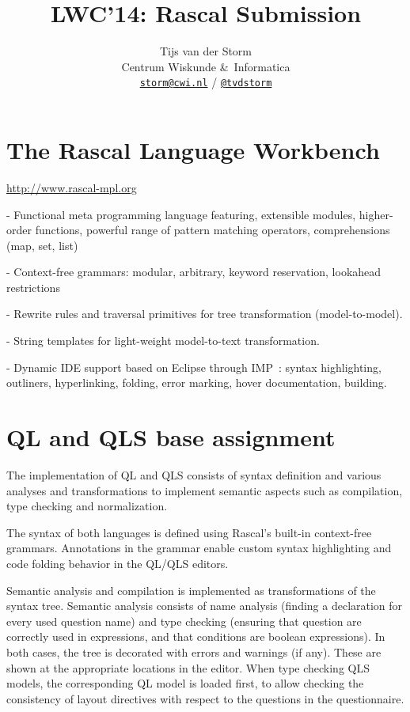 \documentclass[a4paper]{article}
\begin{document}
\title{LWC'14: Rascal Submission}
\author{Tijs van der Storm \\ 
Centrum Wiskunde \&\ Informatica \\
\href{mailto:storm@cwi.nl}{\texttt{storm@cwi.nl}} / \href{http://twitter.com/tvdstorm}{\texttt{@tvdstorm}}
}
\maketitle

\section{The Rascal Language Workbench}


\url{http://www.rascal-mpl.org}

\cite{KlintSV09}

- Functional meta programming language featuring, extensible modules,
higher-order functions, powerful range of pattern matching operators,
comprehensions (map, set, list)

- Context-free grammars: modular, arbitrary, keyword reservation,
lookahead restrictions

- Rewrite rules and traversal primitives for tree transformation
(model-to-model).

- String templates for light-weight model-to-text transformation.

- Dynamic IDE support based on Eclipse through
IMP~\cite{CharlesFSDV09}: syntax highlighting, outliners,
hyperlinking, folding, error marking, hover documentation, building.


\section{QL and QLS base assignment}

The implementation of QL and QLS consists of syntax definition and
various analyses and transformations to implement semantic aspects
such as compilation, type checking and normalization.

The syntax of both languages is defined using Rascal's built-in
context-free grammars. Annotations in the grammar enable custom syntax
highlighting and code folding behavior in the QL/QLS editors.

Semantic analysis and compilation is implemented as transformations of
the syntax tree. Semantic analysis consists of name analysis (finding
a declaration for every used question name) and type checking
(ensuring that question are correctly used in expressions, and that
conditions are boolean expressions). In both cases, the tree is
decorated with errors and warnings (if any). These are shown at the
appropriate locations in the editor. When type checking QLS models,
the corresponding QL model is loaded first, to allow checking the
consistency of layout directives with respect to the questions in the
questionnaire.
\end{document}

